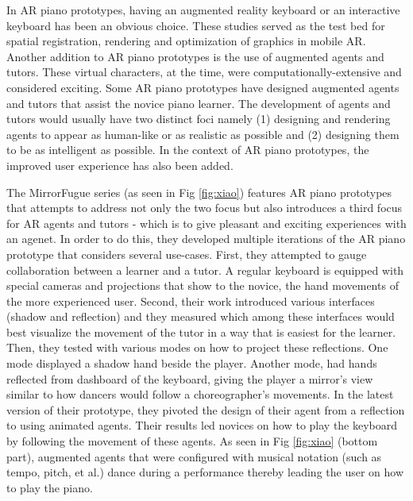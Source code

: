 \documentclass[manuscript,screen]{acmart}
\begin{document}
In AR piano prototypes, having an augmented reality keyboard or an interactive keyboard has been an obvious choice. These studies served as the test bed for spatial registration, rendering and optimization of graphics in mobile AR. Another addition to AR piano prototypes is the use of augmented agents and tutors. These virtual characters, at the time, were computationally-extensive and considered exciting. Some AR piano prototypes have designed augmented agents and tutors that assist the novice piano learner. The development of agents and tutors would usually have two distinct foci namely (1) designing and rendering agents to appear as human-like or as realistic as possible and (2) designing them to be as intelligent as possible. In the context of AR piano prototypes, the improved user experience has also been added. 

The MirrorFugue series \cite{xiao2010mirrorfugue, xiao2011duet, xiao2013mirrorfugue, xiao2014andante} (as seen in Fig \ref{fig:xiao}) features AR piano prototypes that attempts to address not only the two focus but also introduces a third focus for AR agents and tutors - which is to give pleasant and exciting experiences with an agenet. In order to do this, they developed multiple iterations of the AR piano prototype that considers several use-cases. First, they attempted to gauge collaboration between a learner and a tutor. A regular keyboard is equipped with special cameras and projections that show to the novice, the hand movements of the more experienced user. Second, their work introduced various interfaces (shadow and reflection) and they measured which among these interfaces would best visualize the movement of the tutor in a way that is easiest for the learner. Then, they tested with various modes on how to project these reflections. One mode displayed a shadow hand beside the player. Another mode, had hands reflected from dashboard of the keyboard, giving the player a mirror's view similar to how dancers would follow a choreographer's movements. In the latest version of their prototype, they pivoted the design of their agent from a reflection to using animated agents. Their results led novices on how to play the keyboard by following the movement of these agents. As seen in Fig \ref{fig:xiao} (bottom part), augmented agents that were configured with musical notation (such as tempo, pitch, et al.) dance during a performance thereby leading the user on how to play the piano. 
\end{document}
